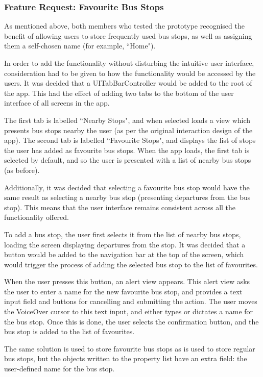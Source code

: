 \documentclass[10pt,twocolumn]{article}
\begin{document}

\subsubsection{Feature Request: Favourite Bus Stops}
As mentioned above, both members who tested the prototype recognised the benefit of allowing users to store frequently used bus stops, as well as assigning them a self-chosen name (for example, ``Home").

In order to add the functionality without disturbing the intuitive user interface, consideration had to be given to how the functionality would be accessed by the users. It was decided that a UITabBarController would be added to the root of the app. This had the effect of adding two tabs to the bottom of the user interface of all screens in the app.

The first tab is labelled ``Nearby Stops", and when selected loads a view which presents bus stops nearby the user (as per the original interaction design of the app). The second tab is labelled ``Favourite Stops", and displays the list of stops the user has added as favourite bus stops. When the app loads, the first tab is selected by default, and so the user is presented with a list of nearby bus stops (as before).

Additionally, it was decided that selecting a favourite bus stop would have the same result as selecting a nearby bus stop (presenting departures from the bus stop). This means that the user interface remains consistent across all the functionality offered.

To add a bus stop, the user first selects it from the list of nearby bus stops, loading the screen displaying departures from the stop. It was decided that a button would be added to the navigation bar at the top of the screen, which would trigger the process of adding the selected bus stop to the list of favourites.

When the user presses this button, an alert view appears. This alert view asks the user to enter a name for the new favourite bus stop, and provides a text input field and buttons for cancelling and submitting the action. The user moves the VoiceOver cursor to this text input, and either types or dictates a name for the bus stop. Once this is done, the user selects the confirmation button, and the bus stop is added to the list of favourites.

The same solution is used to store favourite bus stops as is used to store regular bus stops, but the objects written to the property list have an extra field: the user-defined name for the bus stop.
\end{document}
